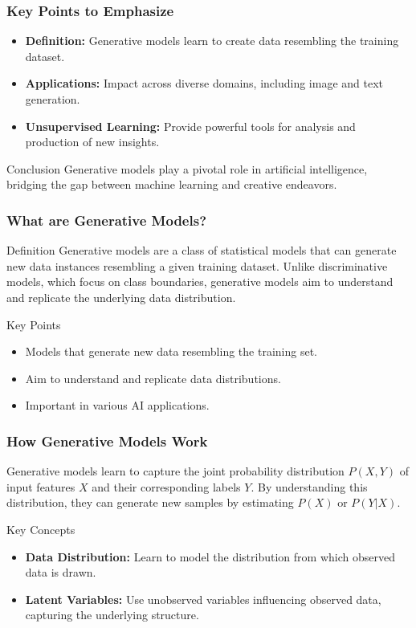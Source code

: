 \documentclass[aspectratio=169]{beamer}
\begin{document}
\begin{frame}[fragile]
    \frametitle{Key Points to Emphasize}
    \begin{itemize}
        \item \textbf{Definition:} Generative models learn to create data resembling the training dataset.
        \item \textbf{Applications:} Impact across diverse domains, including image and text generation.
        \item \textbf{Unsupervised Learning:} Provide powerful tools for analysis and production of new insights.
    \end{itemize}
    \begin{block}{Conclusion}
        Generative models play a pivotal role in artificial intelligence, bridging the gap between machine learning and creative endeavors.
    \end{block}
\end{frame}

\begin{frame}[fragile]
    \frametitle{What are Generative Models?}
    \begin{block}{Definition}
        Generative models are a class of statistical models that can generate new data instances resembling a given training dataset. Unlike discriminative models, which focus on class boundaries, generative models aim to understand and replicate the underlying data distribution.
    \end{block}

    \begin{block}{Key Points}
        \begin{itemize}
            \item Models that generate new data resembling the training set.
            \item Aim to understand and replicate data distributions.
            \item Important in various AI applications.
        \end{itemize}
    \end{block}
\end{frame}

\begin{frame}[fragile]
    \frametitle{How Generative Models Work}
    Generative models learn to capture the joint probability distribution $P(X, Y)$ of input features $X$ and their corresponding labels $Y$. 
    By understanding this distribution, they can generate new samples by estimating $P(X)$ or $P(Y | X)$.

    \begin{block}{Key Concepts}
        \begin{itemize}
            \item \textbf{Data Distribution:} Learn to model the distribution from which observed data is drawn.
            \item \textbf{Latent Variables:} Use unobserved variables influencing observed data, capturing the underlying structure.
        \end{itemize}
    \end{block}
\end{frame}
\end{document}
